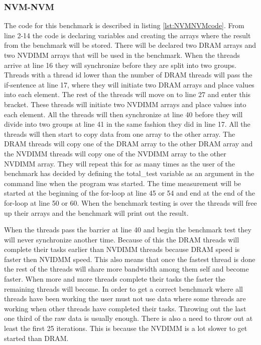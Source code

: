 \documentclass[12pt,a4paper,USenglish]{article}      %
\begin{document}
\subsubsection{NVM-NVM}
\label{section:NVM-NVM}
The code for this benchmark is described in listing \ref{lst:NVMNVMcode}.
From line 2-14 the code is declaring variables and creating the arrays where the result from the benchmark will be stored. There will be declared two DRAM arrays and two NVDIMM arrays that will be used in the benchmark.
When the threads arrive at line 16 they will synchronize before they are split into two groups. Threads with a thread id lower than the number of DRAM threads will pass the if-sentence at line 17, where they will initiate two DRAM arrays and place values into each element.
The rest of the threads will move on to line 27 and enter this bracket. These threads will initiate two NVDIMM arrays and place values into each element.
All the threads will then synchronize at line 40 before they will divide into two groups at line 41 in the same fashion they did in line 17. All the threads will then start to copy data from one array to the other array. The DRAM threads will copy one of the DRAM array to the other DRAM array and the NVDIMM threads will copy one of the NVDIMM array to the other NVDIMM array. They will repeat this for as many times as the user of the benchmark has decided by defining the total\_test variable as an argument in the command line when the program was started. The time measurement will be started at the beginning of the for-loop at line 45 or 54 and end at the end of the for-loop at line 50 or 60.
When the benchmark testing is over the threads will free up their arrays and the benchmark will print out the result. 

When the threads pass the barrier at line 40 and begin the benchmark test they will never synchronize another time. Because of this the DRAM threads will complete their tasks earlier than NVDIMM threads because DRAM speed is faster then NVIDMM speed. This also means that once the fastest thread is done the rest of the threads will share more bandwidth among  them self and become faster. When more and more threads complete their tasks the faster the remaining threads will become.
In order to get a correct benchmark where all threads have been working the user must not use  data where some threads are working when other threads have completed their tasks. Throwing out the last one third of the raw data is usually enough.
There is also a need to throw out at least the first 25 iterations. This is because the NVDIMM is a lot slower to get started than DRAM. 
\end{document}
